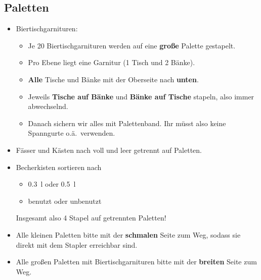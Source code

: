 \subsection{Paletten}
\begin{itemize}
  \item Biertischgarnituren: \begin{itemize}
      \item Je 20 Biertischgarnituren werden auf eine \textbf{große} Palette gestapelt.
      \item Pro Ebene liegt eine Garnitur (1 Tisch und 2 Bänke).
      \item \textbf{Alle} Tische und Bänke mit der Oberseite nach \textbf{unten}.
      \item Jeweils \textbf{Tische auf Bänke} und \textbf{Bänke auf Tische} stapeln, also immer abwechselnd.
      \item Danach sichern wir alles mit Palettenband. Ihr müsst also keine Spanngurte o.ä.\ verwenden.
    \end{itemize}
  \item Fässer und Kästen nach voll und leer getrennt auf Paletten.
  \item Becherkisten sortieren nach
    \begin{itemize}
      \item \SI{0.3}{\litre} oder \SI{0.5}{\litre}
      \item benutzt oder unbenutzt
    \end{itemize}
    Insgesamt also 4 Stapel auf getrennten Paletten!
  \item Alle kleinen Paletten bitte mit der \textbf{schmalen} Seite zum Weg, sodass sie direkt mit dem Stapler erreichbar sind.
  \item Alle großen Paletten mit Biertischgarnituren bitte mit der \textbf{breiten} Seite zum Weg.
\end{itemize}
